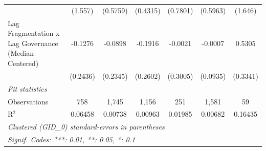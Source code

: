 \begin{table}[H]
\begin{tabular}{lcccccc}
                                                           & (1.557)      & (0.5759)      & (0.4315)      & (0.7801)     & (0.5963)      & (1.646)\\   
      Lag Fragmentation x Lag Governance (Median-Centered) & -0.1276      & -0.0898       & -0.1916       & -0.0021      & -0.0007       & 0.5305\\   
                                                           & (0.2436)     & (0.2345)      & (0.2602)      & (0.3005)     & (0.0935)      & (0.3341)\\   
      \midrule
      \emph{Fit statistics}\\
      Observations                                         & 758          & 1,745         & 1,156         & 251          & 1,581         & 59\\  
      R$^2$                                                & 0.06458      & 0.00738       & 0.00963       & 0.01985      & 0.00682       & 0.16435\\  
      \midrule \midrule
      \multicolumn{7}{l}{\emph{Clustered (GID\_0) standard-errors in parentheses}}\\
      \multicolumn{7}{l}{\emph{Signif. Codes: ***: 0.01, **: 0.05, *: 0.1}}\\
   \end{tabular}
\end{table}



